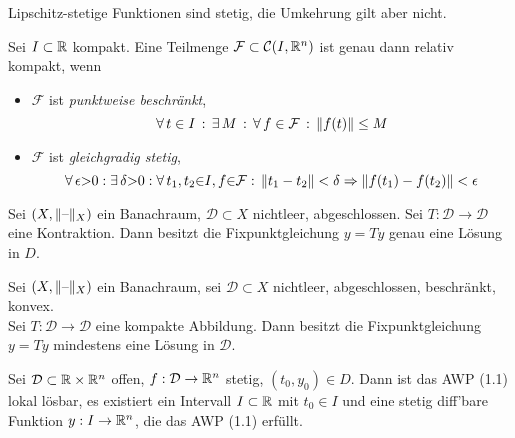 \documentclass{cheat-sheet}
\newcommand{\D}{\mathcal{D}}
\begin{document}
\begin{bem}
  Lipschitz-stetige Funktionen sind stetig, die Umkehrung gilt aber nicht.
\end{bem}


\begin{satz}
  Sei $I \subset \mathbb{R}$ kompakt. Eine Teilmenge $\mathcal{F} \subset \mathcal{C}(I, \mathbb{R}^n)$ ist genau dann relativ kompakt, wenn
  \begin{itemize}
    \item $\mathcal{F}$ ist \emph{punktweise beschränkt}, \dh{}
    \[ \forall \, {t \in I} \,:\, \exists \, {M} \,:\, \forall \, {f \in \mathcal{F}} \,:\, \lVert f(t)\rVert \leq M \]
    \item $\mathcal{F}$ ist \emph{gleichgradig stetig}, \dh{}
    \[ \forall \, {\epsilon {>} 0\!} \,:\,\! \exists \, {\delta {>} 0\!} \,:\,\! \forall \, {t_1, t_2 {\in} I, f {\in} \mathcal{F}\!} \,:\, \lVert t_1 - t_2\rVert < \delta \Rightarrow \lVert f(t_1) - f(t_2)\rVert < \epsilon \]
  \end{itemize}
\end{satz}

\begin{satz}
  Sei $(X, \lVert\text{--}\rVert_X)$ ein Banachraum, $\D \subset X$ nichtleer, abgeschlossen. Sei $T : \D \to \D$ eine Kontraktion. Dann besitzt die Fixpunktgleichung $y = Ty$ genau eine Lösung in $D$.
\end{satz}

\begin{satz}
  Sei $(X, \lVert\text{--}\rVert_X)$ ein Banachraum, sei $\D \subset X$ nichtleer, abgeschlossen, beschränkt, konvex. \\
  Sei $T : \D \to \D$ eine kompakte Abbildung.
  Dann besitzt die Fixpunktgleichung $y = Ty$ mindestens eine Lösung in $\D$.
\end{satz}


\begin{satz}
  Sei $\D \subset \R \times \R^n$ offen, $f : \D \to \R^n$ stetig, $(t_0, y_0) \in D$. Dann ist das AWP (1.1) lokal lösbar, \dh{} es existiert ein Intervall $I \subset \mathbb{R}$ mit $t_0 \in I$ und eine stetig diff'bare Funktion $y : I \to \mathbb{R}^n$, die das AWP (1.1) erfüllt.
\end{satz}

\end{document}

